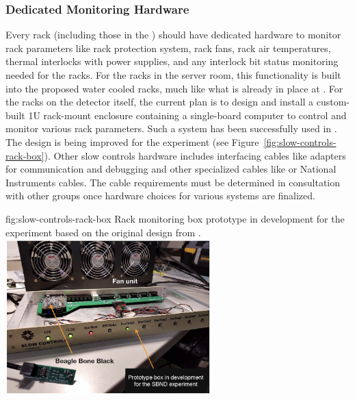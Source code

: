 \subsubsection{Dedicated Monitoring Hardware}

Every rack (including those in the ) should have dedicated hardware to monitor rack parameters like rack protection system, rack fans, rack air temperatures, thermal interlocks with power supplies, and any interlock bit status monitoring needed for the racks. For the racks in the  server room, this functionality is built into the proposed water cooled racks, much like what is already in place at .  For the racks on the detector itself, the current plan is to design and install a custom-built 1U rack-mount enclosure containing a single-board computer to control and monitor various rack parameters. Such a system has been successfully used in . The design is being improved for the  experiment (see Figure~\ref{fig:slow-controls-rack-box}). Other slow controls hardware includes interfacing cables like adapters for communication and debugging and other specialized cables like  
or National Instruments cables. The cable requirements must be determined in consultation with other groups once hardware choices for various systems are finalized.

\begin{dunefigure}{fig:slow-controls-rack-box}
{Rack monitoring box prototype in development for the  experiment based on the original design from .}
\includegraphics[width=0.6\textwidth]{graphics/cisc-slow-controls-rackbox}
\end{dunefigure}


